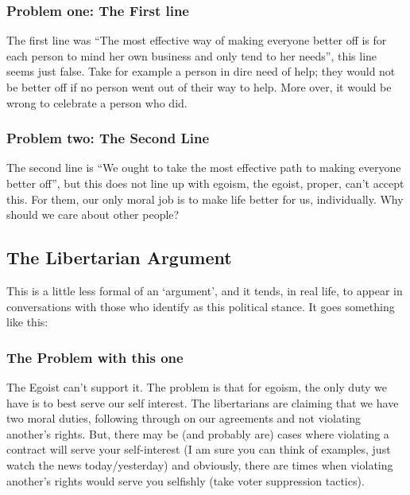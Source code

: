 \subsubsection{Problem one: The First line}

The first line was “The most effective way of making everyone better off is for each person to mind her own business and only tend to her needs”, this line seems just false. Take for example a person in dire need of help; they would not be better off if no person went out of their way to help. More over, it would be wrong to celebrate a person who did.

\subsubsection{Problem two: The Second Line}

The second line is “We ought to take the most effective path to making everyone better off”, but this does not line up with egoism, the egoist, proper, can’t accept this. For them, our only moral job is to make life better for us, individually. Why should we care about other people?

\subsection{The Libertarian Argument}

This is a little less formal of an ‘argument’, and it tends, in real life, to appear in conversations with those who identify as this political stance. It goes something like this:


\subsubsection{The Problem with this one}

The Egoist can’t support it. The problem is that for egoism, the only duty we have is to best serve our self interest. The libertarians are claiming that we have two moral duties, following through on our agreements and not violating another’s rights. But, there may be (and probably are) cases where violating a contract will serve your self-interest (I am sure you can think of examples, just watch the news today/yesterday) and obviously, there are times when violating another’s rights would serve you selfishly (take voter suppression tactics).

